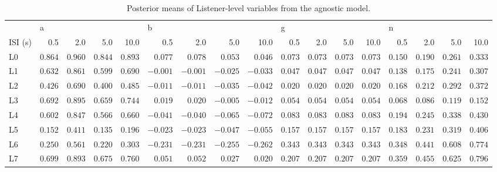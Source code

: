 \begin{table} \centering \caption{Posterior means of Listener-level variables from the agnostic model.} \label{vars} \begin{tabular}{lrrrrrrrrrrrrrrrr} \toprule {} & \multicolumn{4}{l}{a} & \multicolumn{4}{l}{b} & \multicolumn{4}{l}{g} & \multicolumn{4}{l}{n} \\ ISI (s) & 0.5 & 2.0 & 5.0 & 10.0 & 0.5 & 2.0 & 5.0 & 10.0 & 0.5 & 2.0 & 5.0 & 10.0 & 0.5 & 2.0 & 5.0 & 10.0 \\ \midrule L0 & $0.864$ & $0.960$ & $0.844$ & $0.893$ & $0.077$ & $0.078$ & $0.053$ & $0.046$ & $0.073$ & $0.073$ & $0.073$ & $0.073$ & $0.150$ & $0.190$ & $0.261$ & $0.333$ \\ L1 & $0.632$ & $0.861$ & $0.599$ & $0.690$ & $-0.001$ & $-0.001$ & $-0.025$ & $-0.033$ & $0.047$ & $0.047$ & $0.047$ & $0.047$ & $0.138$ & $0.175$ & $0.241$ & $0.307$ \\ L2 & $0.426$ & $0.690$ & $0.400$ & $0.485$ & $-0.011$ & $-0.011$ & $-0.035$ & $-0.042$ & $0.020$ & $0.020$ & $0.020$ & $0.020$ & $0.168$ & $0.212$ & $0.292$ & $0.372$ \\ L3 & $0.692$ & $0.895$ & $0.659$ & $0.744$ & $0.019$ & $0.020$ & $-0.005$ & $-0.012$ & $0.054$ & $0.054$ & $0.054$ & $0.054$ & $0.068$ & $0.086$ & $0.119$ & $0.152$ \\ L4 & $0.602$ & $0.847$ & $0.566$ & $0.660$ & $-0.041$ & $-0.040$ & $-0.065$ & $-0.072$ & $0.083$ & $0.083$ & $0.083$ & $0.083$ & $0.194$ & $0.245$ & $0.338$ & $0.430$ \\ L5 & $0.152$ & $0.411$ & $0.135$ & $0.196$ & $-0.023$ & $-0.023$ & $-0.047$ & $-0.055$ & $0.157$ & $0.157$ & $0.157$ & $0.157$ & $0.183$ & $0.231$ & $0.319$ & $0.406$ \\ L6 & $0.250$ & $0.561$ & $0.220$ & $0.303$ & $-0.231$ & $-0.231$ & $-0.255$ & $-0.262$ & $0.343$ & $0.343$ & $0.343$ & $0.343$ & $0.348$ & $0.441$ & $0.608$ & $0.774$ \\ L7 & $0.699$ & $0.893$ & $0.675$ & $0.760$ & $0.051$ & $0.052$ & $0.027$ & $0.020$ & $0.207$ & $0.207$ & $0.207$ & $0.207$ & $0.359$ & $0.455$ & $0.625$ & $0.796$ \\ \bottomrule \end{tabular} \end{table}